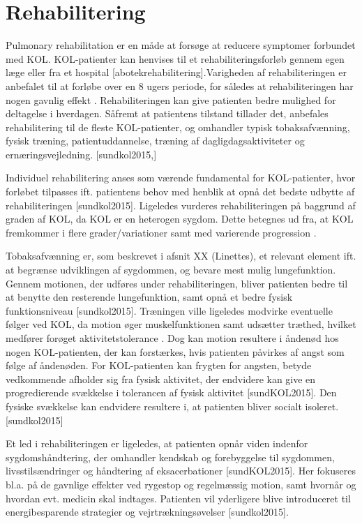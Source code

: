 \section{Rehabilitering}
Pulmonary rehabilitation er en måde at forsøge at reducere symptomer forbundet med KOL. 
KOL-patienter kan henvises til et rehabiliteringsforløb gennem egen læge eller fra et hospital [abotekrehabilitering].Varigheden af rehabiliteringen er anbefalet til at forløbe over en 8 ugers periode, for således at rehabiliteringen har nogen gavnlig effekt \cite{McCarthy2015}. 
Rehabiliteringen kan give patienten bedre mulighed for deltagelse i hverdagen. Såfremt at patientens tilstand tillader det, anbefales rehabilitering til de fleste KOL-patienter, og omhandler typisk tobaksafvænning, fysisk træning, patientuddannelse, træning af dagligdagsaktiviteter og ernæringsvejledning. \cite{McCarthy2015,Habraken2011} [sundkol2015,] 

Individuel rehabilitering anses som værende fundamental for KOL-patienter, hvor forløbet tilpasses ift. patientens behov med henblik at opnå det bedste udbytte af rehabiliteringen \cite{McCarthy2015,Habraken2011} [sundkol2015]. Ligeledes vurderes rehabiliteringen på baggrund af graden af KOL, da KOL er en heterogen sygdom. Dette betegnes ud fra, at KOL fremkommer i flere grader/variationer samt med varierende progression \cite{McCarthy2015}. 

Tobaksafvænning er, som beskrevet i afsnit XX (Linettes), et relevant element ift. at begrænse udviklingen af sygdommen, og bevare mest mulig lungefunktion. Gennem motionen, der udføres under rehabiliteringen, bliver patienten bedre til at benytte den resterende lungefunktion, samt opnå et bedre fysisk funktionsniveau [sundkol2015]. 
Træningen ville ligeledes modvirke eventuelle følger ved KOL, da motion øger muskelfunktionen samt udsætter træthed, hvilket medfører forøget aktivitetstolerance \cite{McCarthy2015}. Dog kan motion resultere i åndenød hos nogen KOL-patienten, der kan forstærkes, hvis patienten påvirkes af angst som følge af åndenøden. For KOL-patienten kan frygten for angsten, betyde vedkommende afholder sig fra fysisk aktivitet, der endvidere kan give en progredierende svækkelse i tolerancen af fysisk aktivitet \cite{McCarthy2015} [sundKOL2015]. Den fysiske svækkelse kan endvidere resultere i, at patienten bliver socialt isoleret. [sundkol2015]
  
Et led i rehabiliteringen er ligeledes, at patienten opnår viden indenfor sygdomshåndtering, der omhandler kendskab og forebyggelse til sygdommen, livsstilsændringer og håndtering af eksacerbationer\cite{McCarthy2015} [sundKOL2015]. Her fokuseres bl.a. på de gavnlige effekter ved rygestop og regelmæssig motion, samt hvornår og hvordan evt. medicin skal indtages. Patienten vil yderligere blive introduceret til energibesparende strategier og vejrtrækningsøvelser \cite{McCarthy2015} [sundkol2015].   

